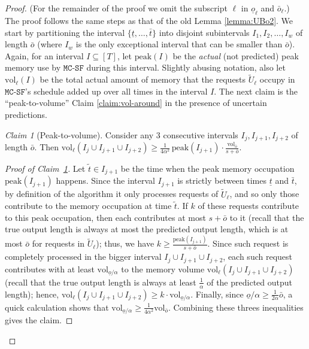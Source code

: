 \documentclass[11pt, a4paper]{article}
\theoremstyle{plain}
\theoremstyle{definition}
\theoremstyle{remark}
\newtheorem{claim}[theorem]{Claim}
\newcommand{\mcsdf}{\texttt{MC-SF}}
\newcommand{\vol}{\textrm{vol}}
\newcommand{\alg}{\mcsdf}
\newcommand{\peak}{\mathrm{peak}}
\begin{document}
\begin{proof}
(For the remainder of the proof we omit the subscript $\ell$ in $\underline{o}_\ell$ and $\bar{o}_\ell$.) The proof follows the same steps as that of the old Lemma \ref{lemma:UBo2}. We start by partitioning the interval $\{\underline{t},\ldots,\bar{t}\}$ into disjoint subintervals $I_1,I_2,\ldots,I_w$ of length $\bar{o}$ (where $I_w$ is the only exceptional interval that can be smaller than $\bar{o}$). Again, for an interval $I \subseteq [T]$, let $\peak(I)$ be the \emph{actual} (not predicted) peak memory use by $\alg$ during this interval. Slightly abusing notation, also let $\vol_\ell(I)$ be the total actual amount of memory that the requests $\tilde{U}_\ell$ occupy in $\alg$'s schedule added up over all times in the interval $I$. The next claim is the ``peak-to-volume'' Claim \ref{claim:vol-around} in the presence of uncertain predictions. 

\begin{claim}[Peak-to-volume] \label{claim:vol-around2}
	Consider any 3 consecutive intervals $I_j, I_{j+1}, I_{j+2}$ of length $\bar{o}$. Then $\vol_\ell(I_j \cup I_{j+1} \cup I_{j+2})\ge \frac{1}{4\alpha^2}\, \peak(I_{j+1}) \cdot \frac{\vol_{\bar{o}}}{s + \bar{o}}$.
\end{claim}

\begin{proof}[Proof of Claim~\ref{claim:vol-around2}]
	Let $\tilde{t} \in I_{j+1}$ be the time when the peak memory occupation $\peak(I_{j+1})$ happens. Since the interval $I_{j+1}$ is strictly between times $\underline{t}$ and $\bar{t}$, by definition of the algorithm it only processes requests of $\tilde{U}_\ell$, and so only those contribute to the memory occupation at time $\tilde{t}$. If $k$ of these requests contribute to this peak occupation, then each contributes at most $s + \bar{o}$ to it (recall that the true output length is always at most the predicted output length, which is at most $\bar{o}$ for requests in $\tilde{U}_\ell$); thus, we have $k \ge \frac{\peak(I_{j+1})}{s+\bar{o}}$. Since such request is completely processed in the bigger interval $I_j \cup I_{j+1}\cup I_{j+2}$, each such request contributes with at least $\vol_{\underline{o}/\alpha}$ to the memory volume $\vol_\ell(I_j \cup I_{j+1}\cup I_{j+2})$ (recall that the true output length is always at least $\frac{1}{\alpha}$ of the predicted output length); hence, $\vol_\ell(I_j \cup I_{j+1}\cup I_{j+2}) \ge k \cdot \vol_{\underline{o}/\alpha}$. Finally, since $\underline{o}/\alpha \ge \frac{1}{2\alpha} \bar{o}$, a quick calculation shows that $\vol_{\underline{o}/\alpha} \ge \frac{1}{4\alpha^2} \vol_{\bar{o}}$. Combining these threes inequalities gives the claim. 
\end{proof}






\end{proof}
\end{document}
